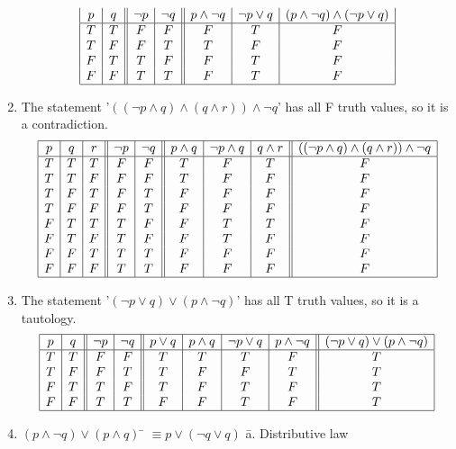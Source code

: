\documentclass{article}
\begin{document}
\begin{enumerate}[label=\textbf{\arabic*.}]
\[\begin{array}{|c|c||c|c||c|c|c|}
p & q & \neg p & \neg q & p \land \neg q & \neg p \lor q &(p \land \neg q) \land (\neg p \lor q)\\
\hline
T & T & F & F & F & T & F \\
T & F & F & T & T & F & F \\
F & T & T & F & F & T & F \\
F & F & T & T & F & T & F \\
\hline 
\end{array}
\]
\item %
The statement '$((\neg p \land q) \land (q \land r)) \land \neg q$' has all F truth values, so it is a contradiction.
\[
\begin{array}{|c|c|c||c|c||c|c|c||c|}
\hline
p & q & r & \neg p & \neg q & p \land q & \neg p \land q & q \land r & ((\neg p \land q) \land (q \land r)) \land \neg q\\
\hline
T & T & T & F & F & T & F & T & F \\
T & T & F & F & F & T & F & F & F \\
T & F & T & F & T & F & F & F & F \\
T & F & F & F & T & F & F & F & F \\
F & T & T & T & F & F & T & T & F \\
F & T & F & T & F & F & T & F & F \\
F & F & T & T & T & F & F & F & F \\
F & F & F & T & T & F & F & F & F \\
\hline 
\end{array}
\]
\item %
The statement '$(\neg p \lor q) \lor (p \land \neg q)$' has all T truth values, so it is a tautology.
\[
\begin{array}{|c|c||c|c||c|c|c|c||c|}
\hline
p & q & \neg p & \neg q & p \lor q & p \land q & \neg p \lor q & p \land \neg q & (\neg p \lor q) \lor (p \land \neg q)\\
\hline
T & T & F & F & T & T & T & F & T \\
T & F & F & T & T & F & F & T & T \\
F & T & T & F & T & F & T & F & T \\
F & F & T & T & F & F & T & F & T \\
\hline 
\end{array}
\]
\item %
\begin{tabbing}
$(p \land \neg q) \lor (p \land q)$ \= $\equiv p \lor (\neg q \lor q)$ \hspace{2.8cm} \= a. Distributive law\\

\end{tabbing}
\end{enumerate}
\end{document}
